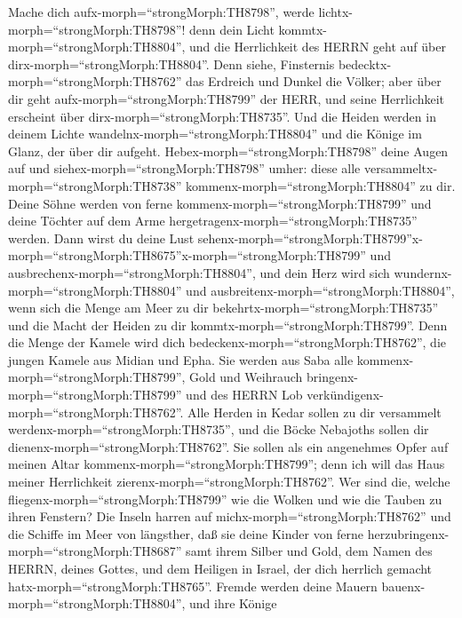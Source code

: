  Mache dich aufx-morph=``strongMorph:TH8798'', werde
lichtx-morph=``strongMorph:TH8798''! denn dein Licht
kommtx-morph=``strongMorph:TH8804'', und die Herrlichkeit des HERRN geht
auf über dirx-morph=``strongMorph:TH8804''.  Denn siehe,
Finsternis bedecktx-morph=``strongMorph:TH8762'' das Erdreich und Dunkel
die Völker; aber über dir geht aufx-morph=``strongMorph:TH8799'' der
HERR, und seine Herrlichkeit erscheint über
dirx-morph=``strongMorph:TH8735''.  Und die Heiden werden in
deinem Lichte wandelnx-morph=``strongMorph:TH8804'' und die Könige im
Glanz, der über dir aufgeht. 
Hebex-morph=``strongMorph:TH8798'' deine Augen auf und
siehex-morph=``strongMorph:TH8798'' umher: diese alle
versammeltx-morph=``strongMorph:TH8738''
kommenx-morph=``strongMorph:TH8804'' zu dir. Deine Söhne werden von
ferne kommenx-morph=``strongMorph:TH8799'' und deine Töchter auf dem
Arme hergetragenx-morph=``strongMorph:TH8735'' werden.  Dann
wirst du deine Lust
sehenx-morph=``strongMorph:TH8799''\textbar x-morph=``strongMorph:TH8675''x-morph=``strongMorph:TH8799''
und ausbrechenx-morph=``strongMorph:TH8804'', und dein Herz wird sich
wundernx-morph=``strongMorph:TH8804'' und
ausbreitenx-morph=``strongMorph:TH8804'', wenn sich die Menge am Meer zu
dir bekehrtx-morph=``strongMorph:TH8735'' und die Macht der Heiden zu
dir kommtx-morph=``strongMorph:TH8799''.  Denn die Menge der
Kamele wird dich bedeckenx-morph=``strongMorph:TH8762'', die jungen
Kamele aus Midian und Epha. Sie werden aus Saba alle
kommenx-morph=``strongMorph:TH8799'', Gold und Weihrauch
bringenx-morph=``strongMorph:TH8799'' und des HERRN Lob
verkündigenx-morph=``strongMorph:TH8762''.  Alle Herden in
Kedar sollen zu dir versammelt werdenx-morph=``strongMorph:TH8735'', und
die Böcke Nebajoths sollen dir dienenx-morph=``strongMorph:TH8762''. Sie
sollen als ein angenehmes Opfer auf meinen Altar
kommenx-morph=``strongMorph:TH8799''; denn ich will das Haus meiner
Herrlichkeit zierenx-morph=``strongMorph:TH8762''.  Wer sind
die, welche fliegenx-morph=``strongMorph:TH8799'' wie die Wolken und wie
die Tauben zu ihren Fenstern?  Die Inseln harren auf
michx-morph=``strongMorph:TH8762'' und die Schiffe im Meer von
längsther, daß sie deine Kinder von ferne
herzubringenx-morph=``strongMorph:TH8687'' samt ihrem Silber und Gold,
dem Namen des HERRN, deines Gottes, und dem Heiligen in Israel, der dich
herrlich gemacht hatx-morph=``strongMorph:TH8765''.  Fremde
werden deine Mauern bauenx-morph=``strongMorph:TH8804'', und ihre Könige
